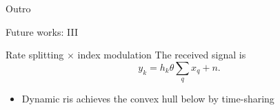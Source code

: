 \documentclass[presentation,xcolor={table},9pt]{beamer}
\begin{document}
\begin{section}{Outro}
	\begin{frame}{Future works: III}
		\begin{block}{Rate splitting $\times$ index modulation}
			The received signal is
			\begin{equation*}
				y_k = h_k \theta \sum_q x_q + n.
			\end{equation*}
			\vspace{-1em}
			\begin{itemize}
				\item Dynamic \gls{ris} achieves the convex hull below by time-sharing \cite{Mu2021a}
				\begin{figure}
					\centering
\end{figure}
\end{itemize}
\end{block}
\end{frame}
\end{section}
\end{document}

